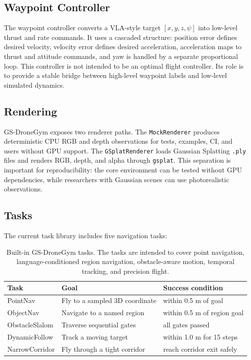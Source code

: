 \documentclass[11pt]{article}
\begin{document}
\subsection{Waypoint Controller}

The waypoint controller converts a VLA-style target $[x,y,z,\psi]$ into low-level thrust and rate commands. It uses a cascaded structure: position error defines desired velocity, velocity error defines desired acceleration, acceleration maps to thrust and attitude commands, and yaw is handled by a separate proportional loop. This controller is not intended to be an optimal flight controller. Its role is to provide a stable bridge between high-level waypoint labels and low-level simulated dynamics.

\subsection{Rendering}

GS-DroneGym exposes two renderer paths. The \texttt{MockRenderer} produces deterministic CPU RGB and depth observations for tests, examples, CI, and users without GPU support. The \texttt{GSplatRenderer} loads Gaussian Splatting \texttt{.ply} files and renders RGB, depth, and alpha through \texttt{gsplat}. This separation is important for reproducibility: the core environment can be tested without GPU dependencies, while researchers with Gaussian scenes can use photorealistic observations.

\subsection{Tasks}

The current task library includes five navigation tasks:

\begin{table}[h]
\centering
\begin{tabular}{lll}
\toprule
Task & Goal & Success condition \\
\midrule
PointNav & Fly to a sampled 3D coordinate & within 0.5 m of goal \\
ObjectNav & Navigate to a named region & within 0.5 m of region goal \\
ObstacleSlalom & Traverse sequential gates & all gates passed \\
DynamicFollow & Track a moving target & within 1.0 m for 15 steps \\
NarrowCorridor & Fly through a tight corridor & reach corridor exit safely \\
\bottomrule
\end{tabular}
\caption{Built-in GS-DroneGym tasks. The tasks are intended to cover point navigation, language-conditioned region navigation, obstacle-aware motion, temporal tracking, and precision flight.}
\label{tab:tasks}
\end{table}
\end{document}
